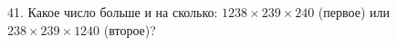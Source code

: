 41. Какое число больше и на сколько: $1238\times239\times240$ (первое) или $238\times239\times1240$ (второе)?\\

